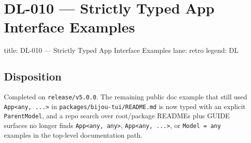 \chapter{DL-010 --- Strictly Typed App Interface Examples}\label{record-300}

\smallskip

\begin{RecordMeta}
title: DL-010 — Strictly Typed App Interface Examples
lane: retro
legend: DL

\end{RecordMeta}

\section{Disposition}\label{record-300-disposition}

Completed on \texttt{r\allowbreak{}e\allowbreak{}l\allowbreak{}e\allowbreak{}a\allowbreak{}s\allowbreak{}e\allowbreak{}/\allowbreak{}v\allowbreak{}5\allowbreak{}.\allowbreak{}0\allowbreak{}.\allowbreak{}0}. The remaining public doc example that still used \texttt{A\allowbreak{}p\allowbreak{}p\allowbreak{}<\allowbreak{}a\allowbreak{}n\allowbreak{}y\allowbreak{},\allowbreak{} \allowbreak{}.\allowbreak{}.\allowbreak{}.\allowbreak{}>} in \texttt{p\allowbreak{}a\allowbreak{}c\allowbreak{}k\allowbreak{}a\allowbreak{}g\allowbreak{}e\allowbreak{}s\allowbreak{}/\allowbreak{}b\allowbreak{}i\allowbreak{}j\allowbreak{}o\allowbreak{}u\allowbreak{}-\allowbreak{}t\allowbreak{}u\allowbreak{}i\allowbreak{}/\allowbreak{}R\allowbreak{}E\allowbreak{}A\allowbreak{}D\allowbreak{}M\allowbreak{}E\allowbreak{}.\allowbreak{}m\allowbreak{}d} is now typed with an explicit \texttt{P\allowbreak{}a\allowbreak{}r\allowbreak{}e\allowbreak{}n\allowbreak{}t\allowbreak{}M\allowbreak{}o\allowbreak{}d\allowbreak{}e\allowbreak{}l}, and a repo search over root/package READMEs plus GUIDE surfaces no longer finds \texttt{A\allowbreak{}p\allowbreak{}p\allowbreak{}<\allowbreak{}a\allowbreak{}n\allowbreak{}y\allowbreak{},\allowbreak{} \allowbreak{}a\allowbreak{}n\allowbreak{}y\allowbreak{}>}, \texttt{A\allowbreak{}p\allowbreak{}p\allowbreak{}<\allowbreak{}a\allowbreak{}n\allowbreak{}y\allowbreak{},\allowbreak{} \allowbreak{}.\allowbreak{}.\allowbreak{}.\allowbreak{}>}, or \texttt{M\allowbreak{}o\allowbreak{}d\allowbreak{}e\allowbreak{}l\allowbreak{} \allowbreak{}=\allowbreak{} \allowbreak{}a\allowbreak{}n\allowbreak{}y} examples in the top-level documentation path.

